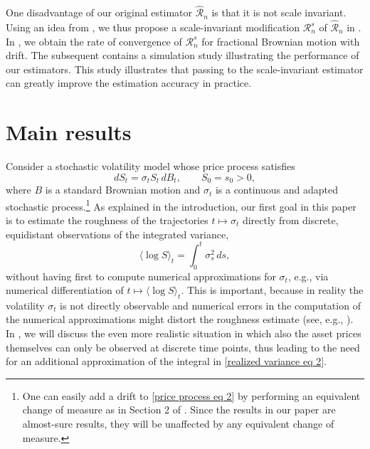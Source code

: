 \documentclass[12pt,reqno]{article}
\def\wh{\widehat}
\numberwithin{equation}{section}
\def\cR{{\mathscr R}}
\theoremstyle{definition}
\def\<{\langle}
\def\>{\rangle}
\def\wh{\widehat}
\begin{document}
One disadvantage of our original estimator $\wh\cR_n$ is that it is not scale invariant. Using an idea from  \cite{HanSchiedHurst}, we thus propose a scale-invariant modification $\cR^s_n$ of $\wh\cR_n$ in . In , we obtain the rate of convergence of $\cR^s_n$ for fractional Brownian motion with drift.
The subsequent  contains a simulation study illustrating the performance of our estimators. This study illustrates that passing to the scale-invariant estimator can greatly improve the estimation accuracy in practice. 


\section{Main results}
\label{Section Main}

Consider a stochastic volatility model whose price process satisfies
\begin{equation}\label{price process eq 2}
dS_t=\sigma_tS_t\,dB_t,\qquad S_0=s_0>0,
\end{equation}
where $B$ is a standard Brownian motion and $\sigma_t$ is a continuous and adapted stochastic process.\footnote{One can easily add a drift to \eqref{price process eq 2}
 by performing an equivalent change of measure as in Section 2 of \cite{BayerFrizGatheral}. Since the results in our paper are almost-sure results, they will be unaffected by any equivalent change of measure.}
As explained in the introduction, our first goal in this paper is to estimate the roughness of the trajectories  $t\mapsto \sigma_t$ directly from discrete, equidistant  observations of the integrated variance,
 \begin{equation}\label{realized variance eq 2}
 \<\log S\>_t = \int_{0}^{t}\sigma^2_s \,ds,
 \end{equation}
 without having first to compute numerical approximations for  $\sigma_t$, e.g., via numerical differentiation of $t\mapsto\<\log S\>_t$. This is important, because in reality the volatility $\sigma_t$ is not directly observable and numerical errors in the computation of the numerical approximations might distort the roughness estimate (see, e.g., \cite{ContDasArtefact}).  In , we will discuss the even more realistic situation in which also  the asset prices themselves can only be observed at discrete time points, thus leading to the need for an additional approximation of the integral in \eqref{realized variance eq 2}. 
  
\end{document}
